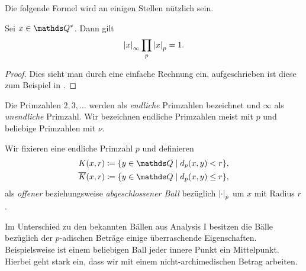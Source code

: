 Die folgende Formel wird an einigen Stellen nützlich sein.

\begin{satz}[Produktformel]
Sei $x\in \Q^\ast$. Dann gilt
\begin{align*}
\left\vert x\right\vert_\infty \prod_p \left\vert x\right\vert_p=1.
\end{align*}
\end{satz}
\begin{proof}
Dies sieht man durch eine einfache Rechnung ein, aufgeschrieben ist diese zum Beispiel in \cite[Proposition 4.1.4]{Deitmar}.
\end{proof}


\begin{bem}
Die Primzahlen $2,3,\dots$ werden als \emph{endliche} Primzahlen bezeichnet und $\infty$ als \emph{unendliche} Primzahl.
Wir bezeichnen endliche Primzahlen meist mit $p$ und beliebige Primzahlen mit $\nu$.
\end{bem}

\begin{defi}
Wir fixieren eine endliche Primzahl $p$ und definieren
\begin{align*}
K(x,r)\coloneqq\{y \in \Q \mid d_p(x,y)<r\},\\
\overline{K}(x,r) \coloneqq \{y\in \Q \mid d_p(x,y)\leq r\},
\end{align*}
als \emph{offener} beziehungsweise \emph{abgeschlossener Ball}
bezüglich $\left\vert\cdot\right\vert_p$ um $x$ mit Radius $r$.
\end{defi}

Im Unterschied zu den bekannten Bällen aus Analysis I besitzen die Bälle
bezüglich der $p$-adischen Beträge einige überraschende Eigenschaften.
Beispielsweise ist einem beliebigen Ball jeder innere Punkt ein Mittelpunkt.
Hierbei geht stark ein, dass wir mit einem nicht-archimedischen Betrag arbeiten. 

